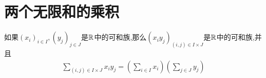 \section{两个无限和的乘积}

\begin{proposition}{}{}
	如果$\left(x_{i}\right)_{i\in I},\left(y_{j}\right)_{j\in J}$是$\mathbb{R}$中的可和族,那么$\left(x_{i}y_{j}\right)_{\left(i,j\right)\in I\times J}$是$\mathbb{R}$中的可和族,并且
	\begin{align*}
		\sum\limits_{\left(i,j\right)\in I\times J}x_{i}y_{j}=\left(\sum\limits_{i\in I}x_{i}\right)\left(\sum\limits_{j\in J}y_{j}\right)
	\end{align*}
\end{proposition}